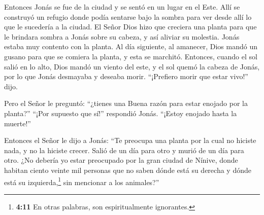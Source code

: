  Entonces Jonás se fue de la ciudad y se sentó en un lugar
en el Este. Allí se construyó un refugio donde podía sentarse bajo la
sombra para ver desde allí lo que le sucedería a la ciudad.
 El Señor Dios hizo que creciera una planta para que le
brindara sombra a Jonás sobre su cabeza, y así aliviar su molestia.
Jonás estaba muy contento con la planta.  Al día
siguiente, al amanecer, Dios mandó un gusano para que se comiera la
planta, y esta se marchitó.  Entonces, cuando el sol salió
en lo alto, Dios mandó un viento del este, y el sol quemó la cabeza de
Jonás, por lo que Jonás desmayaba y deseaba morir. ``¡Prefiero morir que
estar vivo!'' dijo.

 Pero el Señor le preguntó: ``¿tienes una Buena razón para
estar enojado por la planta?'' ``¡Por supuesto que sí!'' respondió
Jonás. ``¡Estoy enojado hasta la muerte!''

 Entonces el Señor le dijo a Jonás: ``Te preocupa una
planta por la cual no hiciste nada, y no la hiciste crecer. Salió de un
día para otro y murió de un día para otro.  ¿No debería
yo estar preocupado por la gran ciudad de Nínive, donde habitan ciento
veinte mil personas que no saben dónde está su derecha y dónde está su
izquierda,\footnote{\textbf{4:11} En otras palabras, son espiritualmente
  ignorantes.} sin mencionar a los animales?''
